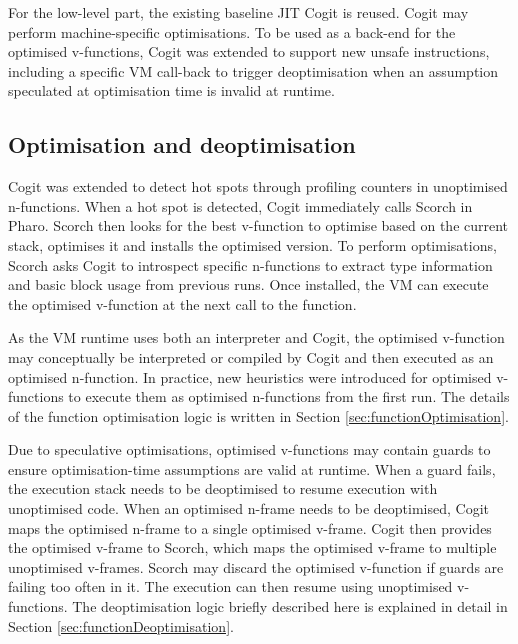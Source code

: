 \documentclass[a4paper,12pt,twoside]{../includes/ThesisStyle}
\begin{document}
For the low-level part, the existing baseline JIT Cogit is reused. Cogit may perform machine-specific optimisations. To be used as a back-end for the optimised v-functions, Cogit was extended to support new unsafe instructions, including a specific VM call-back to trigger deoptimisation when an assumption speculated at optimisation time is invalid at runtime.

\subsection{Optimisation and deoptimisation}
\label{sec:further}

Cogit was extended to detect hot spots through profiling counters in unoptimised n-functions. When a hot spot is detected, Cogit immediately calls Scorch in Pharo. Scorch then looks for the best v-function to optimise based on the current stack, optimises it and installs the optimised version. To perform optimisations, Scorch asks Cogit to introspect specific n-functions to extract type information and basic block usage from previous runs. Once installed, the VM can execute the optimised v-function at the next call to the function. 

As the VM runtime uses both an interpreter and Cogit, the optimised v-function may conceptually be interpreted or compiled by Cogit and then executed as an optimised n-function. In practice, new heuristics were introduced for optimised v-functions to execute them as optimised n-functions from the first run. The details of the function optimisation logic is written in Section \ref{sec:functionOptimisation}.

Due to speculative optimisations, optimised v-functions may contain guards to ensure optimisation-time assumptions are valid at runtime. When a guard fails, the execution stack needs to be deoptimised to resume execution with unoptimised code. When an optimised n-frame needs to be deoptimised, Cogit maps the optimised n-frame to a single optimised v-frame. Cogit then provides the optimised v-frame to Scorch, which maps the optimised v-frame to multiple unoptimised v-frames. Scorch may discard the optimised v-function if guards are failing too often in it. The execution can then resume using unoptimised v-functions. The deoptimisation logic briefly described here is explained in detail in Section \ref{sec:functionDeoptimisation}.

\end{document}
